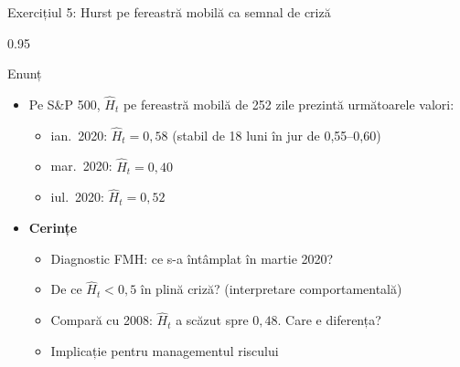 \documentclass[9pt, aspectratio=169, t]{beamer}
\begin{document}
\begin{frame}[shrink=15]{Exercițiul 5: Hurst pe fereastră mobilă ca semnal de criză}
\begin{cminipage}{0.95\textwidth}
\begin{block}{Enunț}
\begin{itemize}\setlength{\itemsep}{0pt}
    \item Pe S\&P 500, $\hat H_t$ pe fereastră mobilă de 252 zile prezintă următoarele valori:
    \begin{itemize}\setlength{\itemsep}{0pt}
        \item ian.\ 2020: $\hat H_t=0{,}58$ (stabil de 18 luni în jur de 0,55--0,60)
        \item mar.\ 2020: $\hat H_t=0{,}40$
        \item iul.\ 2020: $\hat H_t=0{,}52$
    \end{itemize}
\end{itemize}
\end{block}
\begin{itemize}\setlength{\itemsep}{0pt}
    \item \textbf{Cerințe}
    \begin{itemize}\setlength{\itemsep}{0pt}
        \item Diagnostic FMH: ce s-a întâmplat în martie 2020?
        \item De ce $\hat H_t<0{,}5$ în plină criză? (interpretare comportamentală)
        \item Compară cu 2008: $\hat H_t$ a scăzut spre $0{,}48$. Care e diferența?
        \item Implicație pentru managementul riscului
    \end{itemize}
\end{itemize}
\end{cminipage}
\end{frame}
\end{document}
